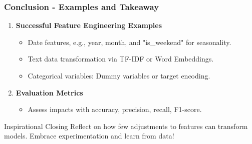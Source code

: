 \documentclass[aspectratio=169]{beamer}
\begin{document}
\begin{frame}[fragile]
    \frametitle{Conclusion - Examples and Takeaway}
    \begin{enumerate}
        \item \textbf{Successful Feature Engineering Examples}
        \begin{itemize}
            \item Date features, e.g., year, month, and "is\_weekend" for seasonality.
            \item Text data transformation via TF-IDF or Word Embeddings.
            \item Categorical variables: Dummy variables or target encoding.
        \end{itemize}

        \item \textbf{Evaluation Metrics}
        \begin{itemize}
            \item Assess impacts with accuracy, precision, recall, F1-score.
        \end{itemize}
    \end{enumerate}
    \begin{block}{Inspirational Closing}
        Reflect on how few adjustments to features can transform models. Embrace experimentation and learn from data!
    \end{block}
\end{frame}
\end{document}
